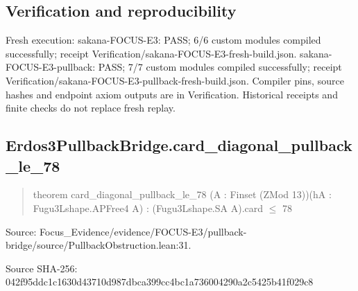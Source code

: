 \documentclass[11pt,a4paper]{article}
\begin{document}
\subsection{Verification and reproducibility}
Fresh execution: sakana-FOCUS-E3: PASS; 6/6 custom modules compiled successfully; receipt Verification/sakana-FOCUS-E3-fresh-build.json. sakana-FOCUS-E3-pullback: PASS; 7/7 custom modules compiled successfully; receipt Verification/sakana-FOCUS-E3-pullback-fresh-build.json. Compiler pins, source hashes and endpoint axiom outputs are in Verification. Historical receipts and finite checks do not replace fresh replay.

\begin{samepage}
\subsection{Erdos3PullbackBridge.card\_diagonal\_pullback\_le\_78}
\begin{quote}\small\ttfamily theorem card\_diagonal\_pullback\_le\_78 (A : Finset (ZMod 13))\newline     (hA : Fugu3Lshape.APFree4 A) : (Fugu3Lshape.SA A).card \ensuremath{\leq} 78\end{quote}
{\small Source: Focus\_Evidence/evidence/FOCUS-E3/pullback-bridge/source/PullbackObstruction.lean:31.\par}

{\small Source SHA-256: 042f95ddc1c1630d43710d987dbca399cc4bc1a736004290a2c5425b41f029c8\par}

\end{samepage}
\end{document}
